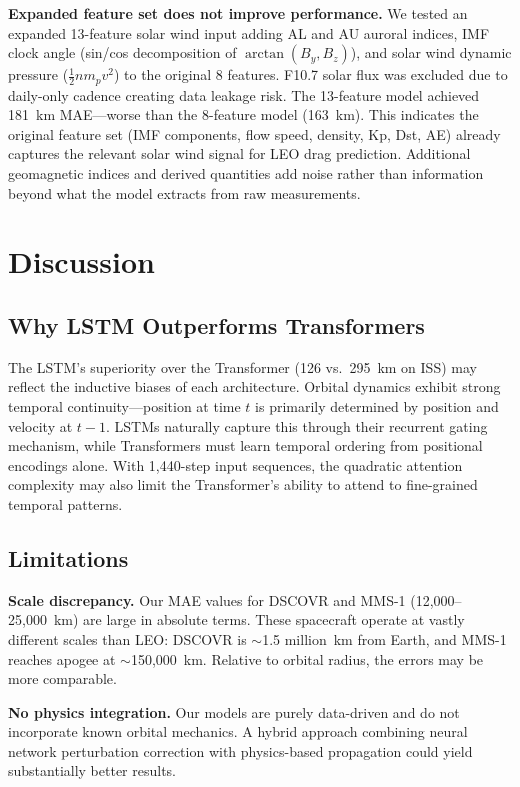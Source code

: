 \documentclass[twocolumn]{article}
\begin{document}
\textbf{Expanded feature set does not improve performance.}
We tested an expanded 13-feature solar wind input adding AL and AU
auroral indices, IMF clock angle (sin/cos decomposition of
$\arctan(B_y, B_z)$), and solar wind dynamic pressure
($\frac{1}{2} n m_p v^2$) to the original 8 features. F10.7 solar
flux was excluded due to daily-only cadence creating data leakage
risk. The 13-feature model achieved 181~km MAE---worse than the
8-feature model (163~km). This indicates the original feature set
(IMF components, flow speed, density, Kp, Dst, AE) already captures
the relevant solar wind signal for LEO drag prediction. Additional
geomagnetic indices and derived quantities add noise rather than
information beyond what the model extracts from raw measurements.

\section{Discussion}
\label{sec:discussion}

\subsection{Why LSTM Outperforms Transformers}

The LSTM's superiority over the Transformer (126 vs.\ 295~km on ISS)
may reflect the inductive biases of each architecture. Orbital dynamics
exhibit strong temporal continuity---position at time $t$ is primarily
determined by position and velocity at $t-1$. LSTMs naturally capture
this through their recurrent gating mechanism, while Transformers must
learn temporal ordering from positional encodings alone. With 1,440-step
input sequences, the quadratic attention complexity may also limit the
Transformer's ability to attend to fine-grained temporal patterns.

\subsection{Limitations}

\textbf{Scale discrepancy.} Our MAE values for DSCOVR and MMS-1
(12,000--25,000~km) are large in absolute terms. These spacecraft
operate at vastly different scales than LEO: DSCOVR is $\sim$1.5 million~km
from Earth, and MMS-1 reaches apogee at $\sim$150,000~km. Relative to
orbital radius, the errors may be more comparable.

\textbf{No physics integration.} Our models are purely data-driven and do
not incorporate known orbital mechanics. A hybrid approach combining
neural network perturbation correction with physics-based propagation
could yield substantially better results.
\end{document}
